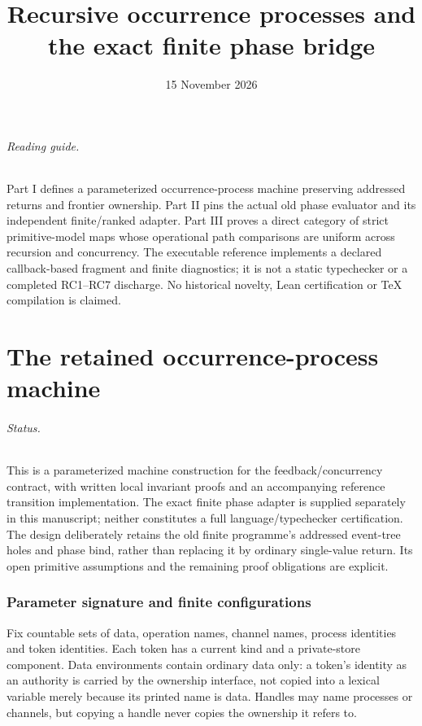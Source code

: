 \documentclass[11pt]{article}
\title{Recursive occurrence processes and the exact finite phase bridge}
\author{}\date{15 November 2026}
\begin{document}
\maketitle
\paragraph{Reading guide.} Part I defines a parameterized occurrence-process machine preserving addressed returns and frontier ownership. Part II pins the actual old phase evaluator and its independent finite/ranked adapter. Part III proves a direct category of strict primitive-model maps whose operational path comparisons are uniform across recursion and concurrency. The executable reference implements a declared callback-based fragment and finite diagnostics; it is not a static typechecker or a completed RC1--RC7 discharge. No historical novelty, Lean certification or TeX compilation is claimed.
\part{The retained occurrence-process machine}

\paragraph{Status.}
This is a parameterized machine construction for the feedback/concurrency contract, with written local invariant proofs and an accompanying reference transition implementation. The exact finite phase adapter is supplied separately in this manuscript; neither constitutes a full language/typechecker certification. The design deliberately retains the old finite programme's addressed event-tree holes and phase bind, rather than replacing it by ordinary single-value return. Its open primitive assumptions and the remaining proof obligations are explicit.

\section{Parameter signature and finite configurations}
Fix countable sets of data, operation names, channel names, process identities and token identities. Each token has a current kind and a private-store component. Data environments contain ordinary data only: a token's identity as an authority is carried by the ownership interface, not copied into a lexical variable merely because its printed name is data. Handles may name processes or channels, but copying a handle never copies the ownership it refers to.
\end{document}
